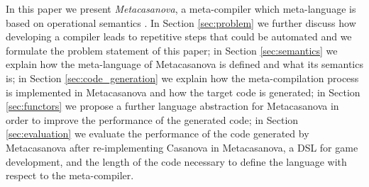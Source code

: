 In this paper we present \textit{Metacasanova}, a meta-compiler which meta-language is based on operational semantics \cite{plotkin1981, kahn1987natural}. In Section \ref{sec:problem} we further discuss how developing a compiler leads to repetitive steps that could be automated and we formulate the problem statement of this paper; in Section \ref{sec:semantics} we explain how the meta-language of Metacasanova is defined and what its semantics is; in Section \ref{sec:code_generation} we explain how the meta-compilation process is implemented in Metacasanova and how the target code is generated; in Section \ref{sec:functors} we propose a further language abstraction for Metacasanova in order to improve the performance of the generated code; in Section \ref{sec:evaluation} we evaluate the performance of the code generated by Metacasanova after re-implementing Casanova \cite{abbadi2015casanova} in Metacasanova, a DSL for game development, and the length of the code necessary to define the language with respect to the meta-compiler.

